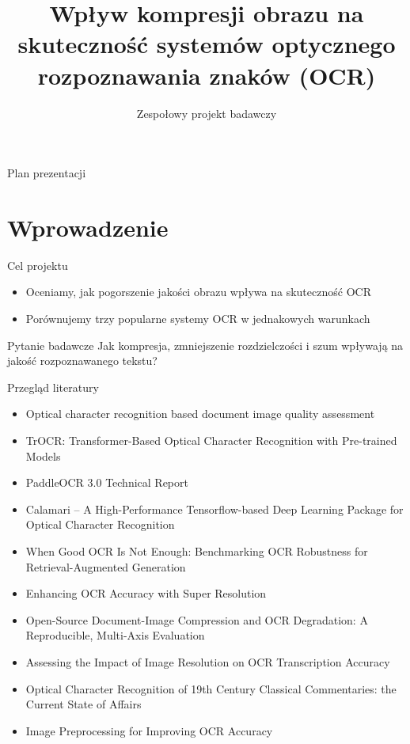 \documentclass[aspectratio=169,11pt]{beamer}
\title[Wpływ kompresji obrazu na OCR]{Wpływ kompresji obrazu na skuteczność systemów optycznego rozpoznawania znaków (OCR)}
\subtitle{Zespołowy projekt badawczy}
\author[\authorone, \authortwo, \authorthree]{\authorone \and \authortwo \and \authorthree}
\date{}
\begin{document}
\begin{frame}
  \titlepage
\end{frame}

\begin{frame}{Plan prezentacji}
  \tableofcontents
\end{frame}

\section{Wprowadzenie}

\begin{frame}{Cel projektu}
  \begin{itemize}
    \item Oceniamy, jak pogorszenie jakości obrazu wpływa na skuteczność OCR
    \item Porównujemy trzy popularne systemy OCR w jednakowych warunkach
  \end{itemize}
  \vspace{0.5em}
  \begin{block}{Pytanie badawcze}
    Jak kompresja, zmniejszenie rozdzielczości i szum wpływają na jakość rozpoznawanego tekstu?
  \end{block}
\end{frame}

\begin{frame}{Przegląd literatury}
  \footnotesize
  \setlength{\itemsep}{0.2em}
  \begin{itemize}
    \item Optical character recognition based document image quality assessment~\cite{frsip2026}
    \item TrOCR: Transformer-Based Optical Character Recognition with Pre-trained Models~\cite{trocr2021}
    \item PaddleOCR 3.0 Technical Report~\cite{paddleocr2025}
    \item Calamari -- A High-Performance Tensorflow-based Deep Learning Package for Optical Character Recognition~\cite{calamari2020}
    \item When Good OCR Is Not Enough: Benchmarking OCR Robustness for Retrieval-Augmented Generation~\cite{ragocr2026}
    \item Enhancing OCR Accuracy with Super Resolution~\cite{superres2018}
    \item Open-Source Document-Image Compression and OCR Degradation: A Reproducible, Multi-Axis Evaluation~\cite{compression2026}
    \item Assessing the Impact of Image Resolution on OCR Transcription Accuracy~\cite{resolution}
    \item Optical Character Recognition of 19th Century Classical Commentaries: the Current State of Affairs~\cite{commentaries2021}
    \item Image Preprocessing for Improving OCR Accuracy~\cite{preprocessing2007}
  \end{itemize}
\end{frame}
\end{document}
